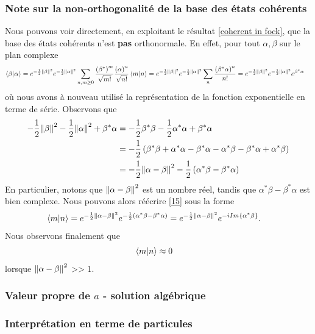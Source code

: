 \documentclass[11pt,oneside,a4paper]{article}
\begin{document}
\subsubsection{Note sur la non-orthogonalité de la base des états cohérents}
Nous pouvons voir directement, en exploitant le résultat \ref{coherent in fock}, que la base des états cohérents n'est \textbf{pas} orthonormale. En effet, pour tout $\alpha,\beta$ sur le plan complexe
\begin{align}
  \braket{\beta}{\alpha} &= e^{-\frac{1}{2}\norm{\beta}^2}e^{-\frac{1}{2}\norm{\alpha}^2}\sum_{n,m\geq 0}\frac{\left(\beta^*\right)^m}{\sqrt{m!}}\frac{\left(\alpha\right)^n}{\sqrt{n!}}\braket{m}{n}
  = e^{-\frac{1}{2}\norm{\beta}^2}e^{-\frac{1}{2}\norm{\alpha}^2} \sum_n \frac{\left(\beta^*\alpha\right)^n}{n!} = e^{-\frac{1}{2}\norm{\beta}^2}e^{-\frac{1}{2}\norm{\alpha}^2}e^{\beta^*\alpha}\label{15}
\end{align}
où nous avons à nouveau utilisé la représentation de la fonction exponentielle en terme de série. Observons que 
\begin{align}
  -\frac{1}{2}\norm{\beta}^2-\frac{1}{2}\norm{\alpha}^2+\beta^*\alpha &= -\frac{1}{2}\beta^*\beta - \frac{1}{2}\alpha^*\alpha+\beta^*\alpha\\
  &= -\frac{1}{2}\left(\beta^*\beta+\alpha^*\alpha-\beta^*\alpha-\alpha^*\beta-\beta^*\alpha+\alpha^*\beta\right)\\
  &= -\frac{1}{2}\norm{\alpha-\beta}^2-\frac{1}{2}\left(\alpha^*\beta-\beta^*\alpha\right)
\end{align}
En particulier, notons que $\norm{\alpha-\beta}^2$ est un nombre réel, tandis que $\alpha^*\beta-\beta^*\alpha$ est bien complexe. Nous pouvons alors réécrire \eqref{15} sous la forme
\begin{align}
  \braket{m}{n} &= e^{-\frac{1}{2}\norm{\alpha-\beta}^2}e^{-\frac{1}{2}\left(\alpha^*\beta-\beta^*\alpha\right)} = e^{-\frac{1}{2}\norm{\alpha-\beta}^2}e^{-iIm\left\{\alpha^*\beta\right\}}.
\end{align}
Nous observons finalement que
\begin{align}
  \braket{m}{n} &\approx 0
\end{align}
lorsque $\norm{\alpha-\beta}^2$ >> $1$.

\subsubsection{Valeur propre de $a$ - solution algébrique}

\subsubsection{Interprétation en terme de particules}
\end{document}
